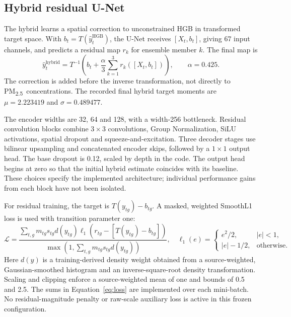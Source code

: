 \documentclass[11pt,a4paper]{article}
\newcommand{\pmfine}{PM\textsubscript{2.5}}
\newcommand{\inv}{T^{-1}}
\begin{document}
\subsection{Hybrid residual U-Net}
The hybrid learns a spatial correction to unconstrained HGB in transformed
target space. With $b_t=T(\widehat y_t^{\mathrm{HGB}})$, the U-Net receives
$[X_t,b_t]$, giving 67 input channels, and predicts a residual map $r_k$ for
ensemble member $k$. The final map is
\begin{equation}
 \widehat y^{\mathrm{hybrid}}_t=
 \inv\!\left(b_t+\frac{\alpha}{3}\sum_{k=1}^{3}r_k([X_t,b_t])\right),
 \qquad \alpha=0.425.
 \label{eq:hybrid}
\end{equation}
The correction is added before the inverse transformation, not directly to
\pmfine\ concentrations. The recorded final hybrid target moments are
$\mu=2.223419$ and $\sigma=0.489477$.

The encoder widths are 32, 64 and 128, with a width-256 bottleneck. Residual
convolution blocks combine $3\times3$ convolutions, Group Normalization, SiLU
activations, spatial dropout and squeeze-and-excitation. Three decoder stages
use bilinear upsampling and concatenated encoder skips, followed by a
$1\times1$ output head. The base dropout is 0.12, scaled by depth in the code.
The output head begins at zero so that the initial hybrid estimate coincides
with its baseline. These choices specify the implemented architecture;
individual performance gains from each block have not been isolated.

For residual training, the target is $T(y_{tg})-b_{tg}$. A masked, weighted
SmoothL1 loss is used with transition parameter one:
\begin{equation}
 \mathcal L=\frac{\sum_{t,g}m_{tg}s_{tg}d(y_{tg})
   \ell_1\!\left(r_{tg}-[T(y_{tg})-b_{tg}]\right)}
 {\max(1,\sum_{t,g}m_{tg}s_{tg}d(y_{tg}))},
 \quad
 \ell_1(e)=\begin{cases}e^2/2,&|e|<1,\\|e|-1/2,&\text{otherwise}.
 \end{cases}
 \label{eq:loss}
\end{equation}
Here $d(y)$ is a training-derived density weight obtained from a
source-weighted, Gaussian-smoothed histogram and an inverse-square-root
density transformation. Scaling and clipping enforce a source-weighted mean
of one and bounds of 0.5 and 2.5. The sums in Equation~\ref{eq:loss} are
implemented over each mini-batch. No residual-magnitude penalty or raw-scale
auxiliary loss is active in this frozen configuration.
\end{document}

